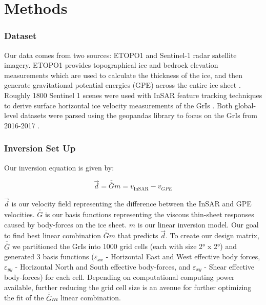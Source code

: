 \documentclass{article}
\begin{document}

\section{Methods}

\subsubsection{Dataset}
Our data comes from two sources: ETOPO1 and Sentinel-1 radar satellite imagery. ETOPO1 provides topographical ice and bedrock elevation measurements which are used to calculate the thickness of the ice, and then generate gravitational potential energies (GPE) across the entire ice sheet \cite{information_ncei_etopo1_nodate}. Roughly 1800 Sentinel 1 scenes were used with InSAR feature tracking techniques to derive surface horizontal ice velocity measurements of the GrIs \cite{nagler_sentinel-1_2015}. Both global-level datasets were parsed using the geopandas library to focus on the GrIs from 2016-2017 \cite{jordahl_geopandasgeopandas_2020}. 



\subsubsection{Inversion Set Up}

Our inversion equation is given by:

$$
\vec{d}=\overline{\overline{G}} m=v_{\text {InSAR}}-v_{GPE}
$$

$\vec{d}$ is our velocity field representing the difference between the InSAR and GPE velocities. $\overline{\overline{G}}$ is our basis functions representing the viscous thin-sheet responses caused by body-forces on the ice sheet. $m$ is our linear inversion model. Our goal to find best linear combination $\overline{\overline{G}} m$ that predicts $\vec{d}$. To create our design matrix, $\overline{\overline{G}}$ we partitioned the GrIs into 1000 grid cells (each with size 2° x 2°) and generated 3 basis functions ($\varepsilon_{xx}$ - Horizontal East and West effective body forces, $\varepsilon_{yy}$ - Horizontal North and South effective body-forces, and $\varepsilon_{xy}$ - Shear effective body-forces) for each cell. Depending on computational computing power available, further reducing the grid cell size is an avenue for further optimizing the fit of the  $\overline{\overline{G}} m$ linear combination.   
\end{document}
